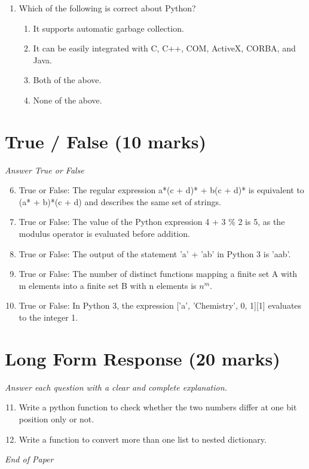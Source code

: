 \documentclass[12pt]{article}
\begin{document}
\begin{enumerate}[label=\arabic*.]
\begin{enumerate}[label=(\alph*)]
    \item A much higher amount of network traffic results
    \item Caching makes file migration impossible
\end{enumerate}
\item Which of the following is correct about Python?
\begin{enumerate}[label=(\alph*)]
    \item It supports automatic garbage collection.
    \item It can be easily integrated with C, C++, COM, ActiveX, CORBA, and Java.
    \item Both of the above.
    \item None of the above.
\end{enumerate}
\end{enumerate}

\section*{True / False (10 marks)}
\textit{Answer True or False}
\begin{enumerate}[label=\arabic*.]
\setcounter{enumi}{5}
\item True or False: The regular expression a*(c + d)* + b(c + d)* is equivalent to (a* + b)*(c + d) and describes the same set of strings.
\item True or False: The value of the Python expression 4 + 3 \% 2 is 5, as the modulus operator is evaluated before addition.
\item True or False: The output of the statement 'a' + 'ab' in Python 3 is 'aab'.
\item True or False: The number of distinct functions mapping a finite set A with m elements into a finite set B with n elements is $n^m$.
\item True or False: In Python 3, the expression ['a', 'Chemistry', 0, 1][1] evaluates to the integer 1.
\end{enumerate}

\section*{Long Form Response (20 marks)}
\textit{Answer each question with a clear and complete explanation.}
\begin{enumerate}[label=\arabic*.]
\setcounter{enumi}{10}
\item Write a python function to check whether the two numbers differ at one bit position only or not.
\item Write a function to convert more than one list to nested dictionary.
\end{enumerate}

\vfill
\noindent\textit{End of Paper}
\end{document}
